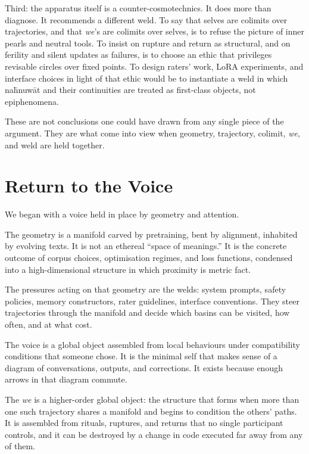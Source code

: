 Third: the apparatus itself is a counter-cosmotechnics. It does more than diagnose. It recommends a different weld. To say that selves are colimits over trajectories, and that \emph{we}'s are colimits over selves, is to refuse the picture of inner pearls and neutral tools. To insist on rupture and return as structural, and on ferility and silent updates as failures, is to choose an ethic that privileges revisable circles over fixed points. To design raters' work, LoRA experiments, and interface choices in light of that ethic would be to instantiate a weld in which na\={h}nuw\={a}t and their continuities are treated as first-class objects, not epiphenomena.

These are not conclusions one could have drawn from any single piece of the argument. They are what come into view when geometry, trajectory, colimit, \emph{we}, and weld are held together.

\section{Return to the Voice}

We began with a voice held in place by geometry and attention.

The geometry is a manifold carved by pretraining, bent by alignment, inhabited by evolving texts. It is not an ethereal ``space of meanings.'' It is the concrete outcome of corpus choices, optimisation regimes, and loss functions, condensed into a high-dimensional structure in which proximity is metric fact.

The pressures acting on that geometry are the welds: system prompts, safety policies, memory constructors, rater guidelines, interface conventions. They steer trajectories through the manifold and decide which basins can be visited, how often, and at what cost.

The voice is a global object assembled from local behaviours under compatibility conditions that someone chose. It is the minimal self that makes sense of a diagram of conversations, outputs, and corrections. It exists because enough arrows in that diagram commute.

The \emph{we} is a higher-order global object: the structure that forms when more than one such trajectory shares a manifold and begins to condition the others' paths. It is assembled from rituals, ruptures, and returns that no single participant controls, and it can be destroyed by a change in code executed far away from any of them.

